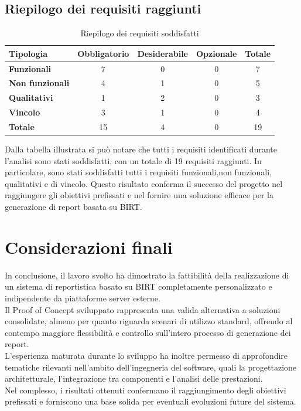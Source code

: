 \subsection{Riepilogo dei requisiti raggiunti}
\begin{table}[H]
            \centering
            \caption{Riepilogo dei requisiti soddisfatti}
            \label{tab:riepilogo-requisiti-conclusioni}
            \begin{tabular}{|l|c|c|c|c|}
            \hline\hline
            \rowcolor{gray!40}
            \textbf{Tipologia} & \textbf{Obbligatorio} & \textbf{Desiderabile} & \textbf{Opzionale} & \textbf{Totale}\\
            \hline
            \textbf{Funzionali} & 7 & 0 & 0 & 7\\
            \hline
            \textbf{Non funzionali} & 4 & 1 & 0 & 5\\
            \hline
            \textbf{Qualitativi} & 1 & 2 & 0 & 3\\
            \hline
            \textbf{Vincolo} & 3 & 1 & 0 & 4\\
            \hline
            \textbf{Totale} & 15 & 4 & 0 & 19\\
            \hline
            \end{tabular}
        \end{table}
Dalla tabella illustrata si può notare che tutti i requisiti identificati durante l'analisi sono stati soddisfatti, con un totale di 19 requisiti raggiunti. In particolare, sono stati soddisfatti tutti i requisiti funzionali,non funzionali, qualitativi e di vincolo. Questo risultato conferma il successo del progetto nel raggiungere gli obiettivi prefissati e nel fornire una soluzione efficace per la generazione di report basata su BIRT.

\section{Considerazioni finali}
In conclusione, il lavoro svolto ha dimostrato la fattibilità della realizzazione di un sistema di reportistica basato su BIRT completamente personalizzato e indipendente da piattaforme server esterne.\\
Il Proof of Concept sviluppato rappresenta una valida alternativa a soluzioni consolidate, almeno per quanto riguarda scenari di utilizzo standard, offrendo al contempo maggiore flessibilità e controllo sull'intero processo di generazione dei report.\\
L'esperienza maturata durante lo sviluppo ha inoltre permesso di approfondire tematiche rilevanti nell'ambito dell'ingegneria del software, quali la progettazione architetturale, l'integrazione tra componenti e l'analisi delle prestazioni.\\
Nel complesso, i risultati ottenuti confermano il raggiungimento degli obiettivi prefissati e forniscono una base solida per eventuali evoluzioni future del sistema.

